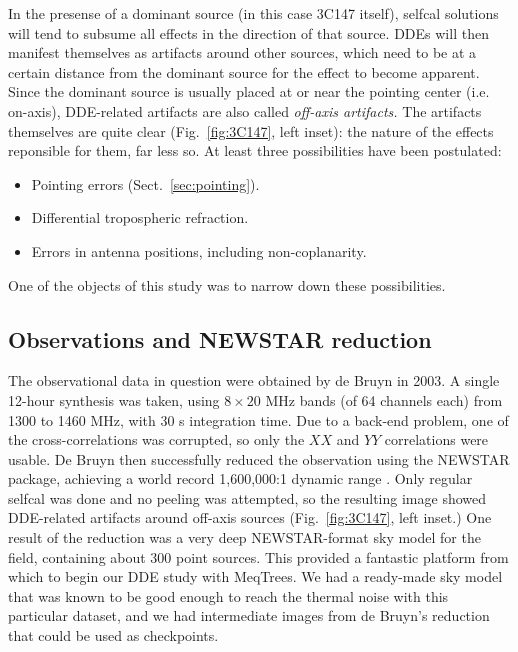 \documentclass[]{aa}
\begin{document}
In the presense of a dominant source (in this case 3C147 itself), selfcal solutions will tend to subsume all effects in the direction of that source. DDEs will then manifest themselves as artifacts around other sources, which need to be at a certain distance from the dominant source for the effect to become apparent. Since the dominant source is usually placed at or near the pointing center (i.e. on-axis), DDE-related artifacts are also called {\em off-axis artifacts.} The artifacts themselves are quite clear (Fig.~\ref{fig:3C147}, left inset): the nature of the effects reponsible for them, far less so. At least three possibilities have been postulated:

\begin{itemize}
\item Pointing errors (Sect.~\ref{sec:pointing}).
\item Differential tropospheric refraction.
\item Errors in antenna positions, including non-coplanarity.
\end{itemize}

One of the objects of this study was to narrow down these possibilities.

\subsection{Observations and NEWSTAR reduction}

The observational data in question were obtained by de Bruyn in 2003. A single 12-hour synthesis was taken, using $8\times20$ MHz bands (of 64 channels each) from 1300 to 1460 MHz, with 30 s integration time. Due to a back-end problem, one of the cross-correlations was corrupted, so only the $XX$ and $YY$ correlations were usable. De Bruyn then successfully reduced the observation using the NEWSTAR package, achieving a world record 1,600,000:1 dynamic range \citep{deBruyn:3C147}. Only regular selfcal was done and no peeling was attempted, so the resulting image showed DDE-related artifacts around off-axis sources (Fig.~\ref{fig:3C147}, left inset.) One result of the reduction was a very deep NEWSTAR-format sky model for the field, containing about 300 point sources. This provided a fantastic platform from which to begin our DDE study with MeqTrees. We had a ready-made sky model that was known to be good enough to reach the thermal noise with this particular dataset, and we had intermediate images from de Bruyn's reduction that could be used as checkpoints.
\end{document}
